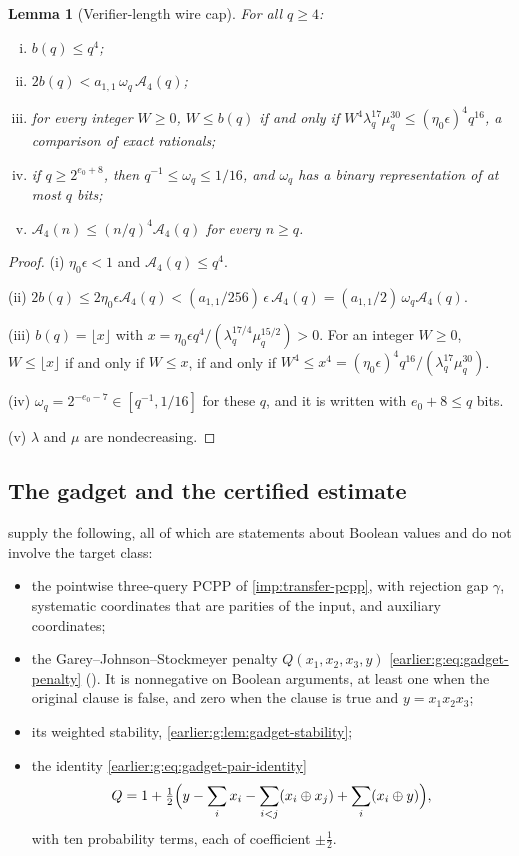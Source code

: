 \documentclass[11pt,letterpaper]{article}
\newtheorem{lemma}[theorem]{Lemma}
\theoremstyle{definition}
\theoremstyle{remark}
\begin{document}
\begin{lemma}[Verifier-length wire cap]\label{lem:ae-cap}
For all \(q\ge4\):
\begin{enumerate}[(i)]
\item \(b(q)\le q^4\);
\item \(2b(q)<a_{1,1}\,\omega_q\,\mathcal A_4(q)\);
\item for every integer \(W\ge0\), \(W\le b(q)\) if and only if
\(W^4\lambda_q^{17}\mu_q^{30}\le(\eta_0\epsilon)^4q^{16}\), a
comparison of exact rationals;
\item if \(q\ge2^{e_0+8}\), then \(q^{-1}\le\omega_q\le1/16\), and
\(\omega_q\) has a binary representation of at most \(q\) bits;
\item \(\mathcal A_4(n)\le(n/q)^4\mathcal A_4(q)\) for every
\(n\ge q\).
\end{enumerate}
\end{lemma}
\begin{proof}
(i) \(\eta_0\epsilon<1\) and \(\mathcal A_4(q)\le q^4\).

(ii)
\(2b(q)\le2\eta_0\epsilon\mathcal A_4(q)<(a_{1,1}/256)\,\epsilon\,\mathcal A_4(q)
=(a_{1,1}/2)\,\omega_q\mathcal A_4(q)\).

(iii) \(b(q)=\lfloor x\rfloor\) with
\(x=\eta_0\epsilon q^4/(\lambda_q^{17/4}\mu_q^{15/2})>0\). For an integer
\(W\ge0\), \(W\le\lfloor x\rfloor\) if and only if \(W\le x\), if and
only if \(W^4\le x^4=(\eta_0\epsilon)^4q^{16}/(\lambda_q^{17}\mu_q^{30})\).

(iv) \(\omega_q=2^{-e_0-7}\in[q^{-1},1/16]\) for these \(q\), and it is
written with \(e_0+8\le q\) bits.

(v) \(\lambda\) and \(\mu\) are nondecreasing.
\end{proof}

\subsection{The gadget and the certified estimate}\label{sec:ae-estimate}

\cite[Sections~11.1--11.2]{NagCG} supply the following, all of which
are statements about Boolean values and do not involve the target
class:
\begin{itemize}
\item the pointwise three-query PCPP of \cref{imp:transfer-pcpp},
with rejection gap \(\gamma\), systematic coordinates that are parities
of the input, and auxiliary coordinates;
\item the Garey--Johnson--Stockmeyer penalty \(Q(x_1,x_2,x_3,y)\)
\eqref{earlier:g:eq:gadget-penalty} (\cite[Equation~(10)]{NagCG}). It is nonnegative on Boolean
arguments, at least one when the original clause is false, and zero
when the clause is true and \(y=x_1x_2x_3\);
\item its weighted stability, \cref{earlier:g:lem:gadget-stability};
\item the identity \eqref{earlier:g:eq:gadget-pair-identity}
\[
 Q=1+\tfrac12\Bigl(y-\sum_ix_i-\sum_{i<j}(x_i\oplus x_j)+\sum_i(x_i\oplus y)\Bigr),
\]
with ten probability terms, each of coefficient \(\pm\frac12\).
\end{itemize}
\end{document}
